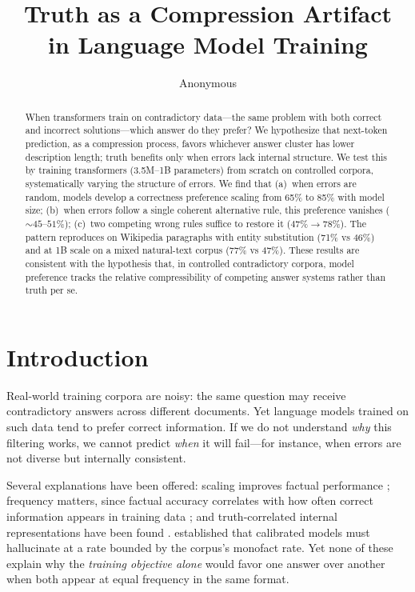 \documentclass{article}
\title{Truth as a Compression Artifact\\in Language Model Training}
\author{Anonymous}
\date{}
\begin{document}
\maketitle

\begin{abstract}
When transformers train on contradictory data---the same problem with both correct and incorrect solutions---which answer do they prefer? We hypothesize that next-token prediction, as a compression process, favors whichever answer cluster has lower description length; truth benefits only when errors lack internal structure. We test this by training transformers (3.5M--1B parameters) from scratch on controlled corpora, systematically varying the structure of errors. We find that (a)~when errors are random, models develop a correctness preference scaling from 65\% to 85\% with model size; (b)~when errors follow a single coherent alternative rule, this preference vanishes (${\sim}45$--$51\%$); (c)~two competing wrong rules suffice to restore it ($47\% \to 78\%$). The pattern reproduces on Wikipedia paragraphs with entity substitution (71\% vs 46\%) and at 1B scale on a mixed natural-text corpus (77\% vs 47\%). These results are consistent with the hypothesis that, in controlled contradictory corpora, model preference tracks the relative compressibility of competing answer systems rather than truth per se.
\end{abstract}

\section{Introduction}

Real-world training corpora are noisy: the same question may receive contradictory answers across different documents. Yet language models trained on such data tend to prefer correct information. If we do not understand \emph{why} this filtering works, we cannot predict \emph{when} it will fail---for instance, when errors are not diverse but internally consistent.

Several explanations have been offered: scaling improves factual performance \citep{kadavath2022language}; frequency matters, since factual accuracy correlates with how often correct information appears in training data \citep{elazar2022measuring,joshi2024personas,kandpal2023large}; and truth-correlated internal representations have been found \citep{burns2023discovering,marks2024geometry,burger2024truth}. \citet{kalai2024calibrated} established that calibrated models must hallucinate at a rate bounded by the corpus's monofact rate. Yet none of these explain why the \emph{training objective alone} would favor one answer over another when both appear at equal frequency in the same format.
\end{document}
